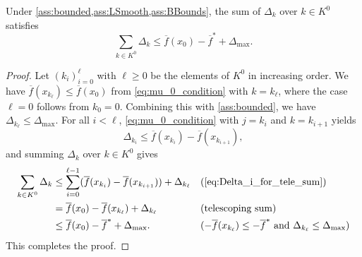 \documentclass[journal]{subfiles}
\begin{document}
\begin{lemma}\label{lem:delta_bound_and_sum}
    Under \cref{ass:bounded,ass:LSmooth,ass:BBounds}, the sum of $\Delta_k$ over $k \in K^0$ satisfies
    \begin{equation*}
        \sum_{k \in K^0} \Delta_k \le \overline{f}(x_0) - \overline{f}^* + \Delta_{\max}.
    \end{equation*}
\end{lemma}
\begin{proof}
    Let $(k_i)_{i=0}^{\ell}$ with $\ell \geq 0$ be the elements of $K^0$ in increasing order.
    We have $\overline{f}(x_{k_{\ell}}) \le \overline{f}(x_0)$ from \cref{eq:mu_0_condition} with $k=k_{\ell}$, where the case $\ell=0$ follows from $k_0=0$.
    Combining this with \cref{ass:bounded}, we have $\Delta_{k_{\ell}} \le \Delta_{\max}$.
    For all $i < \ell$, \cref{eq:mu_0_condition} with $j=k_i$ and $k=k_{i+1}$ yields
    \begin{equation}\label{eq:Delta_i_for_tele_sum}
        \Delta_{k_i} \leq \overline{f}(x_{k_i}) - \overline{f}(x_{k_{i+1}}),
    \end{equation}
    and summing $\Delta_{k}$ over $k \in K^0$ gives
    \begin{align*}
        \sum_{k \in K^0} \Delta_{k}
         & \le \sum_{i=0}^{\ell-1} (\overline{f}(x_{k_i}) - \overline{f}(x_{k_{i+1}})) + \Delta_{k_{\ell}} &  & (\text{\cref{eq:Delta_i_for_tele_sum}})                                                            \\
         & = \overline{f}(x_0) - \overline{f}(x_{k_{\ell}}) + \Delta_{k_{\ell}}                            &  & (\text{telescoping sum})                                                                           \\
         & \leq \overline{f}(x_0) - \overline{f}^* + \Delta_{\max}.                                        &  & (-\overline{f}(x_{k_{\ell}}) \le -\overline{f}^* \text{ and } \Delta_{k_{\ell}} \le \Delta_{\max})
    \end{align*}
    This completes the proof.
    \myQED
\end{proof}
\end{document}
